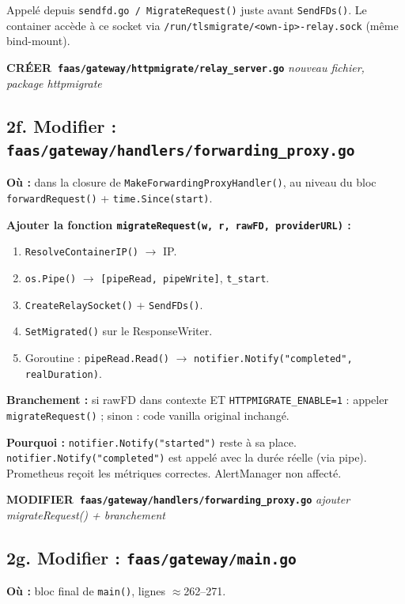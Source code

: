 \documentclass[11pt,a4paper]{article}
\newcommand{\act}[3]{%
  \vspace{0.2em}
  \noindent\colorbox{actionbg}{\parbox{\dimexpr\linewidth-2\fboxsep\relax}{%
    \small\textbf{#1~\texttt{#2}} \hfill \textit{\small #3}\\[-0.3em]
  }}
  \vspace{0.2em}
}
\begin{document}
Appelé depuis \texttt{sendfd.go / MigrateRequest()} juste avant \texttt{SendFDs()}.
Le container accède à ce socket via \texttt{/run/tlsmigrate/<own-ip>-relay.sock}
(même bind-mount).

\act{CRÉER}{faas/gateway/httpmigrate/relay\_server.go}{nouveau fichier, package httpmigrate}

\subsection*{2f. Modifier : \texttt{faas/gateway/handlers/forwarding\_proxy.go}}

\textbf{Où :} dans la closure de \texttt{MakeForwardingProxyHandler()}, au niveau du bloc
\texttt{forwardRequest()} + \texttt{time.Since(start)}.

\textbf{Ajouter la fonction \texttt{migrateRequest(w, r, rawFD, providerURL)} :}
\begin{enumerate}[noitemsep]
  \item \texttt{ResolveContainerIP()} $\to$ IP.
  \item \texttt{os.Pipe()} $\to$ \texttt{[pipeRead, pipeWrite]}, \texttt{t\_start}.
  \item \texttt{CreateRelaySocket()} + \texttt{SendFDs()}.
  \item \texttt{SetMigrated()} sur le ResponseWriter.
  \item Goroutine : \texttt{pipeRead.Read()} $\to$ \texttt{notifier.Notify("completed", realDuration)}.
\end{enumerate}

\textbf{Branchement :} si rawFD dans contexte ET \texttt{HTTPMIGRATE\_ENABLE=1} :
appeler \texttt{migrateRequest()} ; sinon : code vanilla original inchangé.

\textbf{Pourquoi :} \texttt{notifier.Notify("started")} reste à sa place.
\texttt{notifier.Notify("completed")} est appelé avec la durée réelle (via pipe).
Prometheus reçoit les métriques correctes. AlertManager non affecté.

\act{MODIFIER}{faas/gateway/handlers/forwarding\_proxy.go}{ajouter migrateRequest() + branchement}

\subsection*{2g. Modifier : \texttt{faas/gateway/main.go}}

\textbf{Où :} bloc final de \texttt{main()}, lignes $\approx$262--271.
\end{document}
